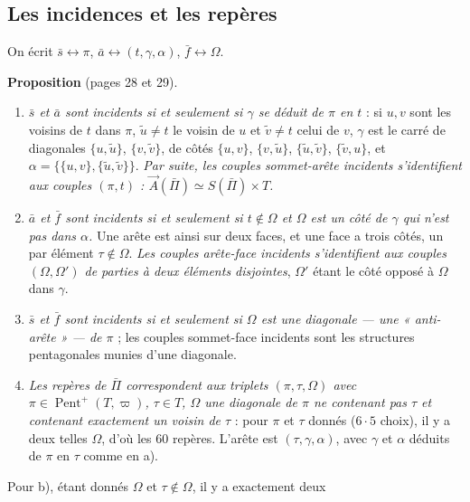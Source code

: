 \documentclass[11pt,a4paper]{article}
\begin{document}
\subsection*{Les incidences et les repères}

On écrit $\bar s \leftrightarrow \pi$, $\bar a \leftrightarrow (t, \gamma,
\alpha)$, $\bar f \leftrightarrow \Omega$.

\textbf{Proposition} (pages 28 et 29).
\begin{enumerate}
  \item[a)] \emph{$\bar s$ et $\bar a$ sont incidents si et seulement si $\gamma$
    se déduit de $\pi$ en $t$} : si $u, v$ sont les voisins de $t$ dans $\pi$,
    $\tilde u \neq t$ le voisin de $u$ et $\tilde v \neq t$ celui de $v$,
    $\gamma$ est le carré de diagonales $\{u, \tilde u\}$, $\{v, \tilde v\}$,
    de côtés $\{u, v\}$, $\{v, \tilde u\}$, $\{\tilde u, \tilde v\}$,
    $\{\tilde v, u\}$, et $\alpha = \bigl\{\{u, v\}, \{\tilde u, \tilde
    v\}\bigr\}$. \emph{Par suite, les couples sommet-arête incidents
    s'identifient aux couples $(\pi, t)$ : $\vec A(\bar\Pi) \simeq S(\bar\Pi)
    \times T$.}
  \item[b)] \emph{$\bar a$ et $\bar f$ sont incidents si et seulement si
    $t \notin \Omega$ et $\Omega$ est un côté de $\gamma$ qui n'est pas dans
    $\alpha$.} Une arête est ainsi sur deux faces, et une face a trois côtés,
    un par élément $\tau \notin \Omega$. \emph{Les couples arête-face
    incidents s'identifient aux couples $(\Omega, \Omega')$ de parties à deux
    éléments disjointes}, $\Omega'$ étant le côté opposé à $\Omega$ dans
    $\gamma$.
  \item[c)] \emph{$\bar s$ et $\bar f$ sont incidents si et seulement si
    $\Omega$ est une diagonale --- une « anti-arête » --- de $\pi$} ; les
    couples sommet-face incidents sont les structures pentagonales munies
    d'une diagonale.
  \item[d)] \emph{Les repères de $\bar\Pi$ correspondent aux triplets
    $(\pi, \tau, \Omega)$ avec $\pi \in \operatorname{Pent}^{+}(T, \varpi)$,
    $\tau \in T$, $\Omega$ une diagonale de $\pi$ ne contenant pas $\tau$ et
    contenant exactement un voisin de $\tau$} : pour $\pi$ et $\tau$ donnés
    ($6 \cdot 5$ choix), il y a deux telles $\Omega$, d'où les $60$ repères.
    L'arête est $(\tau, \gamma, \alpha)$, avec $\gamma$ et $\alpha$ déduits de
    $\pi$ en $\tau$ comme en a).
\end{enumerate}
Pour b), étant donnés $\Omega$ et $\tau \notin \Omega$, il y a exactement deux
\end{document}
